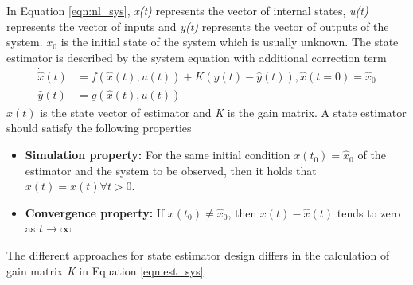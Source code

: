 In Equation \ref{eqn:nl_sys}, \emph{x(t)} represents the vector of internal states, \emph{u(t)} represents the vector of inputs and \emph{y(t)} represents the vector of outputs of the system. $x_0$ is the initial state of the system which is usually unknown. 
The state estimator is described by the system equation with additional correction term
\begin{equation}
\begin{split}
\label{eqn:est_sys}
\dot{\hat{x}}(t) &= f(\hat{x}(t),u(t)) + K(y(t)-\hat{y}(t)) , \hat{x}(t=0) = \hat{x}_0\\
\hat{y}(t) &= g(\hat{x}(t),u(t))
\end{split}
\end{equation}
$\hat{x}(t)$ is the state vector of estimator and \emph{K} is the gain matrix.  A state estimator should satisfy the following properties
\begin{itemize}
\item \textbf{Simulation property:} For the same initial condition $x(t_0) = \hat{x}_0$ of the estimator and the system to be observed, then it holds that $x(t) = \hat{x}(t) \forall t > 0 $.
\item \textbf{Convergence property:} If $x(t_0) \neq \hat{x}_0$, then $x(t) - \hat{x}(t)$ tends to zero as $ t \rightarrow \infty $
\end{itemize}

The different approaches for state estimator design differs in the calculation of gain matrix \emph{K} in Equation \ref{eqn:est_sys}.

